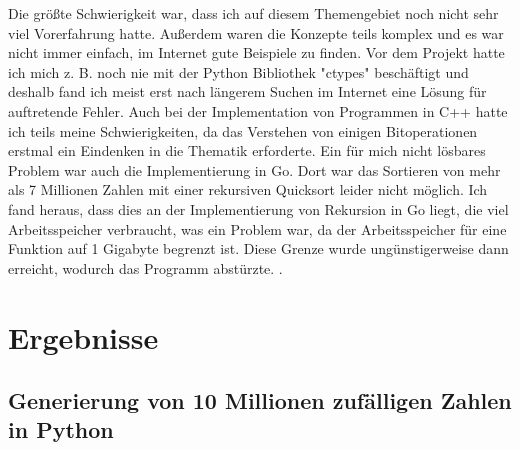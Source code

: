 \documentclass[11pt,a4paper]{article}
\begin{document}
Die größte Schwierigkeit war, dass ich auf diesem Themengebiet noch nicht sehr viel Vorerfahrung hatte.
Außerdem waren die Konzepte teils komplex und es war nicht immer einfach, im Internet gute Beispiele
zu finden. Vor dem Projekt hatte ich mich z. B. noch nie mit der Python Bibliothek "ctypes" beschäftigt
und deshalb fand ich meist erst nach längerem Suchen im Internet eine Lösung für auftretende Fehler.
Auch bei der Implementation von Programmen in C++ hatte ich teils meine Schwierigkeiten, da das Verstehen
von einigen Bitoperationen erstmal ein Eindenken in die Thematik erforderte.
Ein für mich nicht lösbares Problem war auch die Implementierung in Go.
Dort war das Sortieren von mehr als 7 Millionen Zahlen mit einer rekursiven Quicksort leider nicht möglich.
Ich fand heraus, dass dies an der Implementierung von Rekursion in Go liegt, die viel Arbeitsspeicher
verbraucht, was ein Problem war, da der Arbeitsspeicher für eine Funktion auf 1 Gigabyte begrenzt ist.
Diese Grenze wurde ungünstigerweise dann erreicht, wodurch das Programm abstürzte.
\cite{godeeprecursions} \cite{goroutinesize}.

\section{Ergebnisse}

\subsection{Generierung von 10 Millionen zufälligen Zahlen in Python}

\begin{bchart}[min=0, max=30, scale=1.9]
    \smallskip
    \smallskip
    \smallskip
    \smallskip
    \smallskip
\end{bchart}

\vspace{0.5cm}
\end{document}
